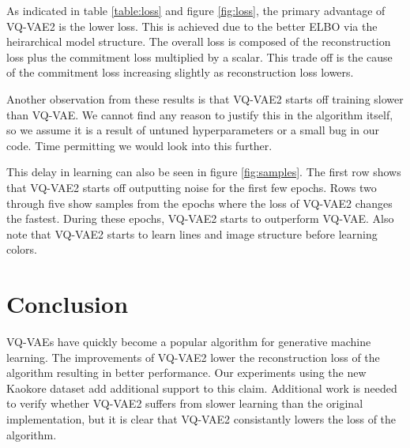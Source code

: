 \documentclass{article}
\begin{document}
As indicated in table \ref{table:loss} and figure \ref{fig:loss}, the primary advantage of VQ-VAE2 is the lower loss. This is achieved due to the better ELBO via the heirarchical model structure. The overall loss is composed of the reconstruction loss plus the commitment loss multiplied by a scalar. This trade off is the cause of the commitment loss increasing slightly as reconstruction loss lowers. 

Another observation from these results is that VQ-VAE2 starts off training slower than VQ-VAE. We cannot find any reason to justify this in the algorithm itself, so we assume it is a result of untuned hyperparameters or a small bug in our code. Time permitting we would look into this further.

This delay in learning can also be seen in figure \ref{fig:samples}. The first row shows that VQ-VAE2 starts off outputting noise for the first few epochs. Rows two through five show samples from the epochs where the loss of VQ-VAE2 changes the fastest. During these epochs, VQ-VAE2 starts to outperform VQ-VAE. Also note that VQ-VAE2 starts to learn lines and image structure before learning colors.


\section{Conclusion}

VQ-VAEs have quickly become a popular algorithm for generative machine learning. The improvements of VQ-VAE2 lower the reconstruction loss of the algorithm resulting in better performance. Our experiments using the new Kaokore dataset add additional support to this claim. Additional work is needed to verify whether VQ-VAE2 suffers from slower learning than the original implementation, but it is clear that VQ-VAE2 consistantly lowers the loss of the algorithm.

\end{document}
